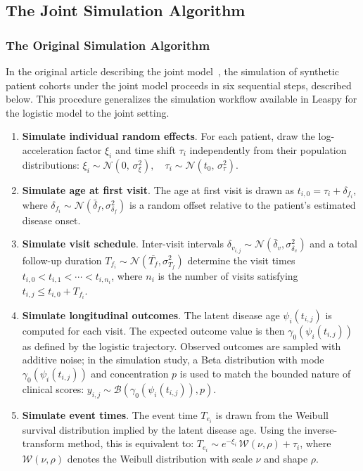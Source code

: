 \documentclass{rapportCS}
\begin{document}
\subsection{The Joint Simulation Algorithm}

\subsubsection{The Original Simulation Algorithm}

In the original article describing the joint model~\cite{ortholand2025joint}, the simulation of synthetic patient cohorts under the joint model proceeds in six sequential steps, described below. This procedure generalizes the simulation workflow available in Leaspy for the logistic model to the joint setting.

\begin{enumerate}
  \item \textbf{Simulate individual random effects}. For each patient, draw the log-acceleration factor $\xi_i$ and time shift $\tau_i$ independently from their population distributions: $\xi_i \sim \mathcal{N}(0,\, \sigma_\xi^2), \quad
  \tau_i \sim \mathcal{N}(t_0,\, \sigma_\tau^2)$.
  \item \textbf{Simulate age at first visit}. The age at first visit is drawn as $t_{i,0} = \tau_i + \delta_{f_i}$, where $\delta_{f_i} \sim \mathcal{N}(\bar{\delta}_f, \sigma_{\delta_f}^2)$ is a random offset relative to the patient's estimated disease onset. 
  \item \textbf{Simulate visit schedule}. Inter-visit intervals $\delta_{v_{i,j}} \sim \mathcal{N}(\bar{\delta}_v, \sigma_{\delta_v}^2)$ and a total follow-up duration $T_{f_i} \sim \mathcal{N}(\overline{T_f}, \sigma_{T_f}^2)$ determine the visit times $t_{i,0} < t_{i,1} < \cdots < t_{i,n_i}$, where $n_i$ is the number of visits satisfying $t_{i,j} \leq t_{i,0} + T_{f_i}$.
  \item \textbf{Simulate longitudinal outcomes}. The latent disease age $\psi_i(t_{i,j})$ is computed for each visit. The expected outcome value is then $\gamma_0(\psi_i(t_{i,j}))$ as defined by the logistic trajectory. Observed outcomes are sampled with additive noise; in the simulation study, a Beta distribution with mode $\gamma_0(\psi_i(t_{i,j}))$ and concentration $p$ is used to match the bounded nature of clinical scores: $y_{i,j} \sim \mathcal{B}(\gamma_0(\psi_i(t_{i,j})), p)$.
  \item \textbf{Simulate event times}. The event time $T_{e_i}$ is drawn from the Weibull survival distribution implied by the latent disease age. Using the inverse-transform method, this is equivalent to: $T_{e_i} \sim e^{-\xi_i}\, \mathcal{W}(\nu, \rho) + \tau_i$, where $\mathcal{W}(\nu, \rho)$ denotes the Weibull distribution with scale $\nu$ and shape $\rho$.

\end{enumerate}
\end{document}
